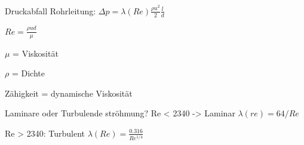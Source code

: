 \documentclass[a4paper]{scrartcl}
\begin{document}
Druckabfall Rohrleitung: $\Delta p = \lambda(Re) \frac{\rho u^2}{2}\frac{l}{d}$

$Re = \frac{\rho u d}{\mu}$

$\mu$ = Viskosität

$\rho$ = Dichte

Zähigkeit = dynamische Viskosität


Laminare oder Turbulende ströhmung? 
Re < 2340 -> Laminar
	$\lambda(re) = 64/Re$
	
Re > 2340: Turbulent
	$\lambda(Re) = \frac{0.316}{Re^{1/4}}$
\end{document}
